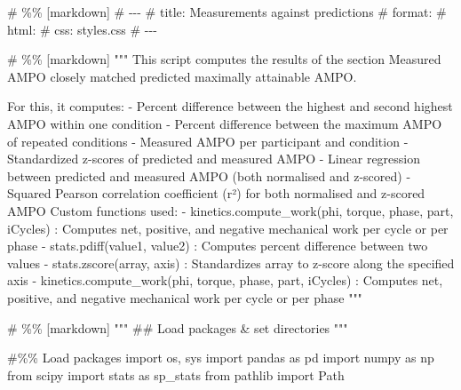 \documentclass[
  11pt,
  a4paper]{article}
\newenvironment{Shaded}{\begin{snugshade}}{\end{snugshade}}
\newcommand{\CommentTok}[1]{\textcolor[rgb]{0.37,0.37,0.37}{#1}}
\newcommand{\ImportTok}[1]{\textcolor[rgb]{0.00,0.46,0.62}{#1}}
\newcommand{\NormalTok}[1]{\textcolor[rgb]{0.00,0.23,0.31}{#1}}
\begin{document}
\begin{Shaded}
\begin{Highlighting}[]
\CommentTok{\# \%\% [markdown]}
\CommentTok{\# {-}{-}{-}}
\CommentTok{\# title: Measurements against predictions}
\CommentTok{\# format:}
\CommentTok{\#   html:}
\CommentTok{\#       css: styles.css}
\CommentTok{\# {-}{-}{-}}

\CommentTok{\# \%\% [markdown]}
\CommentTok{"""}
\CommentTok{This script computes the results of the section \textquotesingle{}Measured AMPO closely matched }
\CommentTok{predicted maximally attainable AMPO\textquotesingle{}. }

\CommentTok{For this, it computes:}
\CommentTok{    }
\CommentTok{{-}   Percent difference between the highest and second highest AMPO within one condition}
\CommentTok{{-}   Percent difference between the maximum AMPO of repeated conditions}
\CommentTok{{-}   Measured AMPO per participant and condition}
\CommentTok{{-}   Standardized z{-}scores of predicted and measured AMPO}
\CommentTok{{-}   Linear regression between predicted and measured AMPO (both normalised and z{-}scored)}
\CommentTok{{-}   Squared Pearson correlation coefficient (r²) for both normalised and z{-}scored AMPO}
\CommentTok{    }
\CommentTok{Custom functions used:}
\CommentTok{    }
\CommentTok{{-}   \textasciigrave{}kinetics.compute\_work(phi, torque, phase, part, iCycles)\textasciigrave{}}
\CommentTok{    : Computes net, positive, and negative mechanical work per cycle or per phase}
\CommentTok{{-}   \textasciigrave{}stats.pdiff(value1, value2)\textasciigrave{}}
\CommentTok{    : Computes percent difference between two values}
\CommentTok{{-}   \textasciigrave{}stats.zscore(array, axis)\textasciigrave{}}
\CommentTok{    : Standardizes array to z{-}score along the specified axis}
\CommentTok{{-}   \textasciigrave{}kinetics.compute\_work(phi, torque, phase, part, iCycles)\textasciigrave{}}
\CommentTok{    : Computes net, positive, and negative mechanical work per cycle or per phase}
\CommentTok{"""}

\CommentTok{\# \%\% [markdown]}
\CommentTok{"""}
\CommentTok{\#\# Load packages \& set directories}
\CommentTok{"""}

\CommentTok{\#\%\% Load packages}
\ImportTok{import}\NormalTok{ os, sys}
\ImportTok{import}\NormalTok{ pandas }\ImportTok{as}\NormalTok{ pd}
\ImportTok{import}\NormalTok{ numpy }\ImportTok{as}\NormalTok{ np}
\ImportTok{from}\NormalTok{ scipy }\ImportTok{import}\NormalTok{ stats }\ImportTok{as}\NormalTok{ sp\_stats}
\ImportTok{from}\NormalTok{ pathlib }\ImportTok{import}\NormalTok{ Path}


\end{Highlighting}
\end{Shaded}
\end{document}
